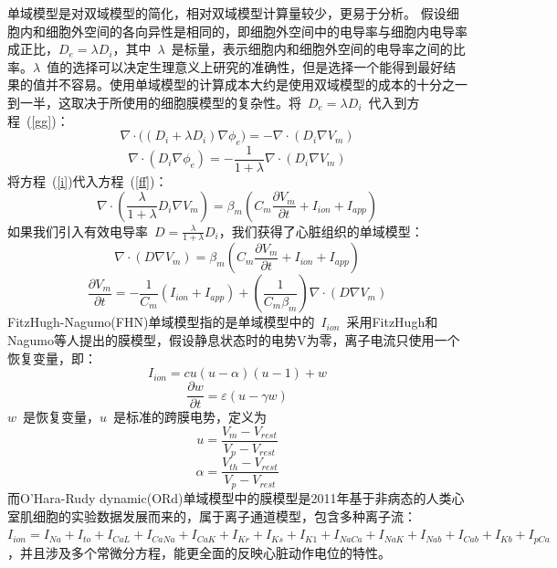 \documentclass[twoside,UTF8]{nputhesis}
\begin{document}
单域模型\cite{Cla2011,Per1993}是对双域模型的简化，相对双域模型计算量较少，更易于分析\cite{JS1}。 假设细胞内和细胞外空间的各向异性是相同的，即细胞外空间中的电导率与细胞内电导率成正比，$D_e=\lambda D_i$，其中~$\lambda$~是标量，表示细胞内和细胞外空间的电导率之间的比率。$\lambda$~值的选择可以决定生理意义上研究的准确性，但是选择一个能得到最好结果的值并不容易。使用单域模型的计算成本大约是使用双域模型的成本的十分之一到一半，这取决于所使用的细胞膜模型的复杂性。将~$D_e=\lambda D_i$~代入到方程~(\ref{gg})：
\begin{equation}
\nabla\cdot\Big((D_i+\lambda D_i)\nabla\phi_e\Big)=-\nabla\cdot(D_i\nabla V_m)
\label{h}
\end{equation}
\begin{equation}
\nabla\cdot(D_i\nabla\phi_e)=-\frac{1}{1+\lambda}\nabla\cdot(D_i\nabla V_m)
\label{i}
\end{equation}
将方程~(\ref{i})代入方程~(\ref{ff})：
\begin{equation}
\nabla\cdot\left(\frac{\lambda}{1+\lambda}D_i\nabla V_m\right)=\beta_m\left(C_m\frac{\partial V_m}{\partial t}+I_{ion}+I_{app}\right)
\label{j}
\end{equation}
如果我们引入有效电导率~$D=\frac{\lambda}{1+\lambda}D_i$\cite{ND1}，我们获得了心脏组织的单域模型：
\begin{equation}
\nabla\cdot(D\nabla V_m)=\beta_m\left(C_m\frac{\partial V_m}{\partial t}+I_{ion}+I_{app}\right)
\label{k}
\end{equation}
\begin{equation}
\frac{\partial V_m}{\partial t}=-\frac{1}{C_m}(I_{ion}+I_{app})+(\frac{1}{C_m\beta_m})\nabla\cdot(D\nabla V_m)
\label{l}
\end{equation}
FitzHugh-Nagumo(FHN)单域模型指的是单域模型中的~$I_{ion}$~采用FitzHugh和Nagumo等人提出的膜模型，假设静息状态时的电势V为零，离子电流只使用一个恢复变量，即：
\begin{equation}
I_{ion}=cu(u-\alpha)(u-1)+w
\label{m}
\end{equation}
\begin{equation}
\frac{\partial w}{\partial t}=\varepsilon(u-\gamma w)
\label{n}
\end{equation}
$w$~是恢复变量，$u$~是标准的跨膜电势，定义为
\begin{equation}
u=\frac{V_m-V_{rest}}{V_p-V_{rest}}
\label{29}
\end{equation}
\begin{equation}
\alpha=\frac{V_{th}-V_{rest}}{V_p-V_{rest}}
\label{o}
\end{equation}
而O’Hara-Rudy dynamic(ORd)单域模型中的膜模型是2011年基于非病态的人类心室肌细胞的实验数据发展而来的\cite{ORD2011}，属于离子通道模型，包含多种离子流：$I_{ion}=I_{Na}+I_{to}+I_{CaL}+I_{CaNa}+I_{CaK}+I_{Kr}+I_{Ks}+I_{K1}+I_{NaCa}+I_{NaK}+I_{Nab}+I_{Cab}+I_{Kb}+I_{pCa}$，并且涉及多个常微分方程，能更全面的反映心脏动作电位的特性。
\end{document}
